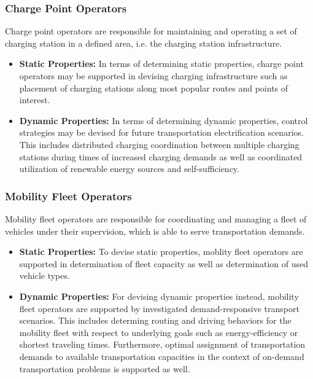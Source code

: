 \documentclass[a4paper,twoside]{article}
\begin{document}
\subsubsection{Charge Point Operators}
Charge point operators are responsible for maintaining and operating a set of charging station in a defined area, i.e. the charging station infrastructure. 

\begin{itemize}
	\item \textbf{Static Properties:} In terms of determining static properties, charge point operators may be supported in devising charging infrastructure such as placement of charging stations along most popular routes and points of interest. 
	\item \textbf{Dynamic Properties:} In terms of determining dynamic properties, control strategies may be devised for future transportation electrification scenarios. This includes distributed charging coordination between multiple charging stations during times of increased charging demands as well as coordinated utilization of renewable energy sources and self-sufficiency.
\end{itemize}

\subsubsection{Mobility Fleet Operators}
Mobility fleet operators are responsible for coordinating and managing a fleet of vehicles under their supervision, which is able to serve transportation demands. 

\begin{itemize}
	\item \textbf{Static Properties:} To devise static properties, moblity fleet operators are supported in determination of fleet capacity as well as determination of used vehicle types.
	\item \textbf{Dynamic Properties:} For devising dynamic properties instead, mobility fleet operators are supported by investigated demand-responsive transport scenarios. This includes determing routing and driving behaviors for the mobility fleet with respect to underlying goals such as energy-efficiency or shortest traveling times. Furthermore, optimal assignment of transportation demands to available transportation capacities in the context of on-demand transportation problems is supported as well.
\end{itemize}
	
\end{document}
